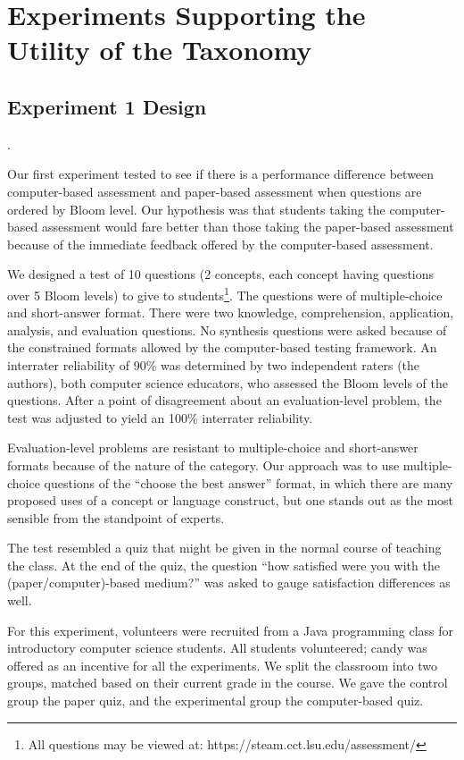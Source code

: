 \section{Experiments Supporting the Utility of the Taxonomy}
\label{sec:experiments}

\subsection{Experiment 1 Design}. 

Our first experiment tested to see if there is a performance difference between
computer-based assessment and paper-based assessment when questions are ordered
by Bloom level.  Our hypothesis was that students taking the computer-based
assessment would fare better than those taking the paper-based assessment
because of the immediate feedback offered by the computer-based assessment.

We designed a test of 10 questions (2 concepts, each concept having questions
over 5 Bloom levels) to give to students\footnote{All questions may be viewed
at: https://steam.cct.lsu.edu/assessment/}. The questions were of
multiple-choice and short-answer format.  There were two knowledge,
comprehension, application, analysis, and evaluation questions.  No synthesis
questions were asked because of the constrained formats allowed by the
computer-based testing framework.  An interrater reliability of 90\% was
determined by two independent raters (the authors), both computer science
educators, who assessed the Bloom levels of the questions.  After a point of
disagreement about an evaluation-level problem, the test was adjusted to yield
an 100\% interrater reliability.

Evaluation-level problems are resistant to multiple-choice and short-answer
formats because of the nature of the category.  Our approach was to use
multiple-choice questions of the ``choose the best answer'' format, in which
there are many proposed uses of a concept or language construct, but one stands
out as the most sensible from the standpoint of experts. 

The test resembled a quiz that might be given in the normal course of teaching
the class. At the end of the quiz, the question ``how satisfied were you with
the (paper/computer)-based medium?'' was asked to gauge satisfaction
differences as well.

For this experiment, volunteers were recruited from a Java programming class
for introductory computer science students.  All students volunteered; candy
was offered as an incentive for all the experiments.  We split the classroom
into two groups, matched based on their current grade in the course.  We gave
the control group the paper quiz, and the experimental group the computer-based
quiz.

